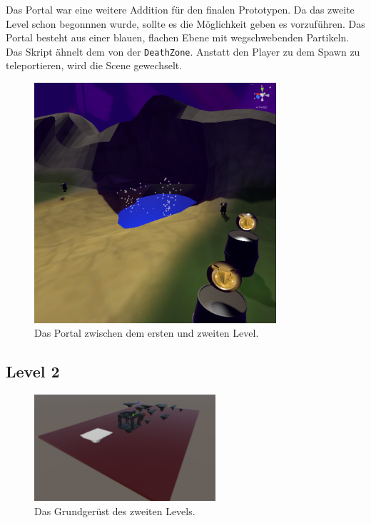 \begin{minipage}[t]{0.4\textwidth}
  Das Portal war eine weitere Addition für den finalen Prototypen. Da das zweite Level schon begonnnen wurde, sollte es die Möglichkeit geben es vorzuführen. Das Portal besteht aus einer blauen, flachen Ebene mit wegschwebenden Partikeln. Das Skript ähnelt dem von der \verb+DeathZone+. Anstatt den Player zu dem Spawn zu teleportieren, wird die Scene gewechselt.

\end{minipage}
\hfill
\begin{minipage}[t]{0.6\textwidth}
  \begin{figure}[H]
    \centering
    \includegraphics[width=0.8\textwidth]{chapters/04/images/V3/Portal.png}
    \caption{Das Portal zwischen dem ersten und zweiten Level.}
  \end{figure}
\end{minipage}


\pagebreak

\subsection{Level 2}
\begin{figure}[h]
  \centering
  \includegraphics*[width=0.6\textwidth]{chapters/04/images/V3/Level2.png}
  \caption{Das Grundgerüst des zweiten Levels.}
  \label{fig:PE09}
\end{figure}

